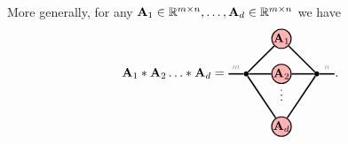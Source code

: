 More generally, for any $\mathbf{A}_1\in\mathbb{R}^{m\times n},\dots,\mathbf{A}_d\in\mathbb{R}^{m\times n}$ we have 
\begin{align*}
\Ab_1\hadam\Ab_2\dots\hadam\Ab_{d} 
=
    \begin{tikzpicture}[baseline=\baseline]
    \tikzset{tensor/.style = {minimum size = 0.5cm,shape = circle,thick,draw=black,inner sep = 0pt}, edge/.style   = {thick,line width=.4mm},every loop/.style={}}
    \def\y{1}
    \def\x{0}
    \node[tensor,fill=red!30!white] (A_1) at (\x,\y){$\Ab_1$};
    \node[tensor,fill=red!30!white] (A_2) at (\x,\y-1){$\Ab_2$};
    \node[draw=none] at (\x,\y-1.5) {\scalebox{1}{\textcolor{black}{$\vdots$}}};
    \node[tensor,fill=red!30!white] (A_N) at (\x,\y-2.5){$\Ab_d$};
    \draw  node[fill = black,circle,inner sep=0pt,minimum size=4pt] (m) at (\x+1,\y-1) {};
    \draw  node[fill = black,circle,inner sep=0pt,minimum size=4pt] (n) at (\x-1,\y-1) {};
    \draw[edge] (A_1) -- (m);
    \draw[edge] (A_2) -- (m);
    \draw[edge] (A_N) -- (m);
    \draw[edge] (A_1) -- (n);
    \draw[edge] (A_2) -- (n);
    \draw[edge] (A_N) -- (n);
    \draw[edge] (m) -- (\x+1.5,\y-1)node [midway,above] {\edgelabel{$n$}};
    \draw[edge] (n) -- (\x-1.5,\y-1)node [midway,above] {\edgelabel{$m$}};
    \end{tikzpicture}.
\end{align*}
